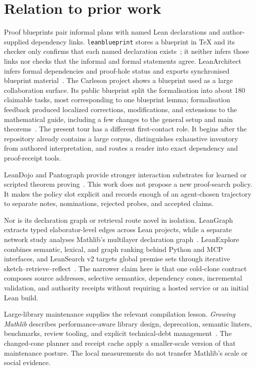 \documentclass[11pt]{article}
\begin{document}
\section{Relation to prior work}\label{sec:related}

Proof blueprints pair informal plans with named Lean declarations and
author-supplied dependency links.  \texttt{leanblueprint} stores a blueprint
in \TeX{} and its checker only confirms that each named declaration
exists~\cite{leanblueprint}; it neither infers those links nor checks that the
informal and formal statements agree.  LeanArchitect infers formal
dependencies and proof-hole status and exports synchronised blueprint
material~\cite{leanarchitect}. The Carleson project shows a blueprint used as
a large collaboration surface. Its public blueprint split the formalisation
into about 180 claimable tasks, most corresponding to one blueprint lemma;
formalisation feedback produced localized corrections, modifications, and
extensions to the mathematical guide, including a few changes to the general
setup and main theorems~\cite{carleson}. The present tour has a different first-contact role. It
begins after the repository already contains a large corpus, distinguishes
exhaustive inventory from authored interpretation, and routes a reader into
exact dependency and proof-receipt tools.

LeanDojo and Pantograph provide stronger interaction substrates for learned or
scripted theorem proving~\cite{leandojo,pantograph}. This work does not propose
a new proof-search policy. It makes the policy slot explicit and records enough
of an agent-chosen trajectory to separate notes, nominations, rejected probes,
and accepted claims.

Nor is its declaration graph or retrieval route novel in isolation.
LeanGraph extracts typed elaborator-level edges across Lean projects, while a
separate network study analyses Mathlib's multilayer declaration
graph~\cite{theoremgraph,mathlibnetwork}. LeanExplore combines semantic,
lexical, and graph ranking behind Python and MCP interfaces, and LeanSearch v2
targets global premise sets through iterative
sketch--retrieve--reflect~\cite{leanexplore,leansearchv2}. The narrower claim
here is that one cold-clone contract composes source addresses, selective
semantics, dependency cones, incremental validation, and authority receipts
without requiring a hosted service or an initial Lean build.

Large-library maintenance supplies the relevant compilation lesson.
\emph{Growing Mathlib} describes performance-aware library design,
deprecation, semantic linters, benchmarks, review tooling, and explicit
technical-debt management~\cite{growingmathlib}. The changed-cone planner and
receipt cache apply a smaller-scale version of that maintenance posture. The
local measurements do not transfer Mathlib's scale or social evidence.
\end{document}
